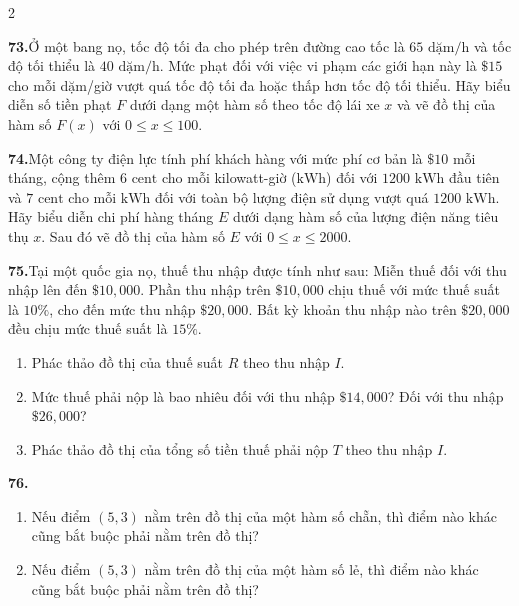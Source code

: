 
\begin{multicols}{2}
\fontsize{8.2pt}{10.2pt}\selectfont
\setlength{\abovedisplayskip}{1.5pt}
\setlength{\belowdisplayskip}{1.5pt}

\noindent\textbf{73.}\enspace Ở một bang nọ, tốc độ tối đa cho phép trên đường cao tốc là $65\text{ dặm/h}$ và tốc độ tối thiểu là $40\text{ dặm/h}$. Mức phạt đối với việc vi phạm các giới hạn này là $\$15$ cho mỗi dặm/giờ vượt quá tốc độ tối đa hoặc thấp hơn tốc độ tối thiểu. Hãy biểu diễn số tiền phạt $F$ dưới dạng một hàm số theo tốc độ lái xe $x$ và vẽ đồ thị của hàm số $F(x)$ với $0 \le x \le 100$.

\medskip
\noindent\textbf{74.}\enspace Một công ty điện lực tính phí khách hàng với mức phí cơ bản là $\$10$ mỗi tháng, cộng thêm $6\text{ cent}$ cho mỗi kilowatt-giờ ($\text{kWh}$) đối với $1200\text{ kWh}$ đầu tiên và $7\text{ cent}$ cho mỗi $\text{kWh}$ đối với toàn bộ lượng điện sử dụng vượt quá $1200\text{ kWh}$. Hãy biểu diễn chi phí hàng tháng $E$ dưới dạng hàm số của lượng điện năng tiêu thụ $x$. Sau đó vẽ đồ thị của hàm số $E$ với $0 \le x \le 2000$.

\medskip
\noindent\textbf{75.}\enspace Tại một quốc gia nọ, thuế thu nhập được tính như sau: Miễn thuế đối với thu nhập lên đến $\$10{,}000$. Phần thu nhập trên $\$10{,}000$ chịu thuế với mức thuế suất là $10\%$, cho đến mức thu nhập $\$20{,}000$. Bất kỳ khoản thu nhập nào trên $\$20{,}000$ đều chịu mức thuế suất là $15\%$.
\begin{enumerate}[label=(\alph*), leftmargin=*, itemsep=1pt, topsep=2pt]
  \item Phác thảo đồ thị của thuế suất $R$ theo thu nhập $I$.
  \item Mức thuế phải nộp là bao nhiêu đối với thu nhập $\$14{,}000$? Đối với thu nhập $\$26{,}000$?
  \item Phác thảo đồ thị của tổng số tiền thuế phải nộp $T$ theo thu nhập $I$.
\end{enumerate}

\noindent\textbf{76.}
\begin{enumerate}[label=(\alph*), leftmargin=*, itemsep=1pt, topsep=2pt]
  \item Nếu điểm $(5, 3)$ nằm trên đồ thị của một hàm số chẵn, thì điểm nào khác cũng bắt buộc phải nằm trên đồ thị?
  \item Nếu điểm $(5, 3)$ nằm trên đồ thị của một hàm số lẻ, thì điểm nào khác cũng bắt buộc phải nằm trên đồ thị?
\end{enumerate}


\end{multicols}
